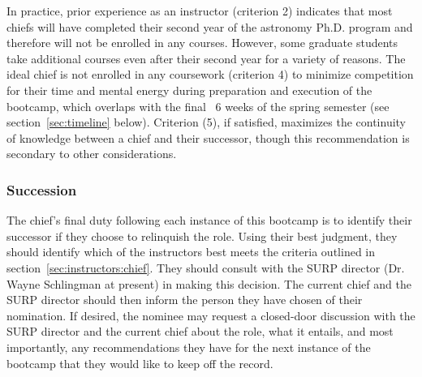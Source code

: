 \par
In practice, prior experience as an instructor (criterion 2) indicates that
most chiefs will have completed their second year of the astronomy Ph.D.
program and therefore will not be enrolled in any courses.
However, some graduate students take additional courses even after their second
year for a variety of reasons.
The ideal chief is not enrolled in any coursework (criterion 4) to minimize
competition for their time and mental energy during preparation and execution
of the bootcamp, which overlaps with the final ~6 weeks of the spring semester
(see section~\ref{sec:timeline} below).
Criterion (5), if satisfied, maximizes the continuity of knowledge between a
chief and their successor, though this recommendation is secondary to other
considerations.

\subsubsection{Succession}
\label{sec:instructors:chief:succession}
\noindent
The chief’s final duty following each instance of this bootcamp is to identify
their successor if they choose to relinquish the role.
Using their best judgment, they should identify which of the instructors best
meets the criteria outlined in section~\ref{sec:instructors:chief}.
They should consult with the SURP director (Dr. Wayne Schlingman at present) in
making this decision.
The current chief and the SURP director should then inform the person they have
chosen of their nomination.
If desired, the nominee may request a closed-door discussion with the SURP
director and the current chief about the role, what it entails, and most
importantly, any recommendations they have for the next instance of the
bootcamp that they would like to keep off the record.


